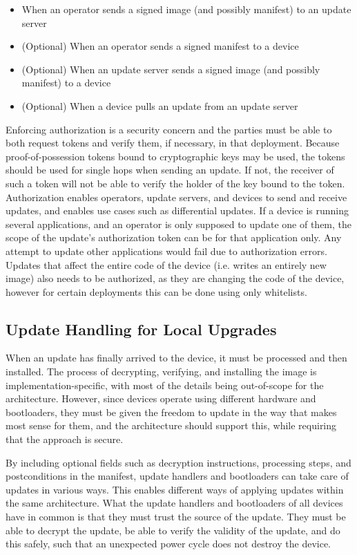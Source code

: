 \documentclass[0-thesis.tex]{subfiles}
\begin{document}
\begin{itemize}
    \item When an operator sends a signed image (and possibly manifest) to an update
            server
    \item (Optional) When an operator sends a signed manifest to a device
    \item (Optional) When an update server sends a signed image (and possibly manifest) to a device
    \item (Optional) When a device pulls an update from an update server
\end{itemize}

Enforcing authorization is a security concern and the parties must be able to both request
tokens and verify them, if necessary, in that deployment. Because proof-of-possession
tokens bound to cryptographic keys may be used, the tokens should be used for single hops
when sending an update. If not, the receiver of such a token will not be able to verify
the holder of the key bound to the token. Authorization enables operators, update servers,
and devices to send and receive updates, and enables use cases such as differential
updates. If a device is running several applications, and an operator is only supposed to
update one of them, the scope of the update's authorization token can be for that
application only. Any attempt to update other applications would fail due to authorization
errors. Updates that affect the entire code of the device (i.e. writes an entirely new
image) also needs to be authorized, as they are changing the code of the device, however
for certain deployments this can be done using only whitelists.

\subsection{Update Handling for Local Upgrades}
\label{ssec:upgrading}
When an update has finally arrived to the device, it must be processed and then installed.
The process of decrypting, verifying, and installing the image is implementation-specific,
with most of the details being out-of-scope for the architecture. However, since devices
operate using different hardware and bootloaders, they must be given the freedom to update
in the way that makes most sense for them, and the architecture should support this, while
requiring that the approach is secure.

By including optional fields such as decryption instructions, processing steps, and
postconditions in the manifest, update handlers and bootloaders can take care of updates
in various ways. This enables different ways of applying updates within the same
architecture. What the update handlers and bootloaders of all devices have in common is
that they must trust the source of the update. They must be able to decrypt the update, be
able to verify the validity of the update, and do this safely, such that an unexpected
power cycle does not destroy the device.
\end{document}
